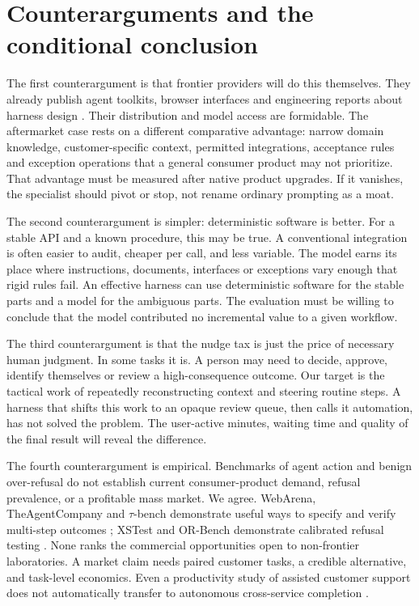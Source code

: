 \section{Counterarguments and the conditional conclusion}

The first counterargument is that frontier providers will do this themselves. They already publish agent toolkits, browser interfaces and engineering reports about harness design \citep{anthropiceffective,openaiagents}. Their distribution and model access are formidable. The aftermarket case rests on a different comparative advantage: narrow domain knowledge, customer-specific context, permitted integrations, acceptance rules and exception operations that a general consumer product may not prioritize. That advantage must be measured after native product upgrades. If it vanishes, the specialist should pivot or stop, not rename ordinary prompting as a moat.

The second counterargument is simpler: deterministic software is better. For a stable API and a known procedure, this may be true. A conventional integration is often easier to audit, cheaper per call, and less variable. The model earns its place where instructions, documents, interfaces or exceptions vary enough that rigid rules fail. An effective harness can use deterministic software for the stable parts and a model for the ambiguous parts. The evaluation must be willing to conclude that the model contributed no incremental value to a given workflow.

The third counterargument is that the nudge tax is just the price of necessary human judgment. In some tasks it is. A person may need to decide, approve, identify themselves or review a high-consequence outcome. Our target is the tactical work of repeatedly reconstructing context and steering routine steps. A harness that shifts this work to an opaque review queue, then calls it automation, has not solved the problem. The user-active minutes, waiting time and quality of the final result will reveal the difference.

The fourth counterargument is empirical. Benchmarks of agent action and benign over-refusal do not establish current consumer-product demand, refusal prevalence, or a profitable mass market. We agree. WebArena, TheAgentCompany and $\tau$-bench demonstrate useful ways to specify and verify multi-step outcomes \citep{webarena,agentcompany,taubench}; XSTest and OR-Bench demonstrate calibrated refusal testing \citep{xstest,orbench}. None ranks the commercial opportunities open to non-frontier laboratories. A market claim needs paired customer tasks, a credible alternative, and task-level economics. Even a productivity study of assisted customer support does not automatically transfer to autonomous cross-service completion \citep{genaiwork}.

